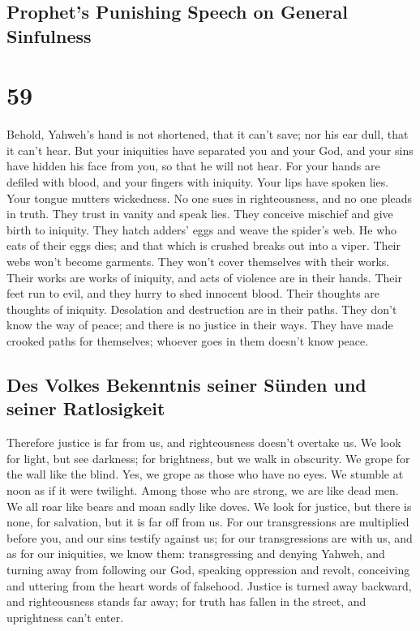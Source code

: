 \hypertarget{prophets-punishing-speech-on-general-sinfulness}{%
\subsection{Prophet's Punishing Speech on General
Sinfulness}\label{prophets-punishing-speech-on-general-sinfulness}}

\hypertarget{section-58}{%
\section{59}\label{section-58}}

 Behold, Yahweh's hand is not shortened, that it can't
save; nor his ear dull, that it can't hear.  But your
iniquities have separated you and your God, and your sins have hidden
his face from you, so that he will not hear.  For your
hands are defiled with blood, and your fingers with iniquity. Your lips
have spoken lies. Your tongue mutters wickedness.  No one
sues in righteousness, and no one pleads in truth. They trust in vanity
and speak lies. They conceive mischief and give birth to iniquity.
 They hatch adders' eggs and weave the spider's web. He
who eats of their eggs dies; and that which is crushed breaks out into a
viper.  Their webs won't become garments. They won't cover
themselves with their works. Their works are works of iniquity, and acts
of violence are in their hands.  Their feet run to evil,
and they hurry to shed innocent blood. Their thoughts are thoughts of
iniquity. Desolation and destruction are in their paths. 
They don't know the way of peace; and there is no justice in their ways.
They have made crooked paths for themselves; whoever goes in them
doesn't know peace.

\hypertarget{des-volkes-bekenntnis-seiner-suxfcnden-und-seiner-ratlosigkeit}{%
\subsection{Des Volkes Bekenntnis seiner Sünden und seiner
Ratlosigkeit}\label{des-volkes-bekenntnis-seiner-suxfcnden-und-seiner-ratlosigkeit}}

 Therefore justice is far from us, and righteousness
doesn't overtake us. We look for light, but see darkness; for
brightness, but we walk in obscurity.  We grope for the
wall like the blind. Yes, we grope as those who have no eyes. We stumble
at noon as if it were twilight. Among those who are strong, we are like
dead men.  We all roar like bears and moan sadly like
doves. We look for justice, but there is none, for salvation, but it is
far off from us.  For our transgressions are multiplied
before you, and our sins testify against us; for our transgressions are
with us, and as for our iniquities, we know them: 
transgressing and denying Yahweh, and turning away from following our
God, speaking oppression and revolt, conceiving and uttering from the
heart words of falsehood.  Justice is turned away
backward, and righteousness stands far away; for truth has fallen in the
street, and uprightness can't enter.

